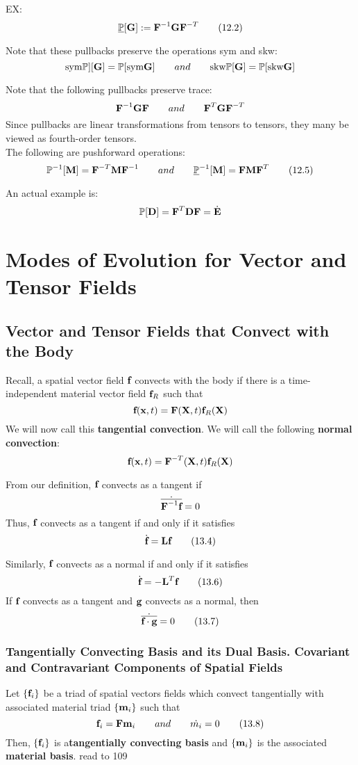 \documentclass{article}
\begin{document}
EX:
\[
\underline{\mathbb{P}}[\textbf{G}]:=\textbf{F}^{-1}\textbf{G}\textbf{F}^{-T}\tag{12.2}
\]

Note that these pullbacks preserve the operations sym and skw:
\[
	\text{sym}\mathbb{P}][\textbf{G}] = \mathbb{P}[\text{sym}\textbf{G}] \qquad and \qquad \text{skw}\mathbb{P}[\textbf{G}]=\mathbb{P}[\text{skw}\textbf{G}]
\]

Note that the following pullbacks preserve trace:
\[
	\textbf{F}^{-1}\textbf{G}\textbf{F} \qquad and \qquad \textbf{F}^T\textbf{G}\textbf{F}^{-T}
\]
Since pullbacks are linear transformations from tensors to tensors, they many be viewed as fourth-order tensors.\\
The following are pushforward operations:
\[
	\mathbb{P}^{-1}[\textbf{M}] = \textbf{F}^{-T}\textbf{M}\textbf{F}^{-1} \qquad and \qquad \underline{\mathbb{P}}^{-1}[\textbf{M}] = \textbf{F}\textbf{M}\textbf{F}^T \tag{12.5}
\]

An actual example is:
\[
	\mathbb{P}[\textbf{D}] = \textbf{F}^T\textbf{D}\textbf{F} = \dot{\textbf{E}}
\]

\section{Modes of Evolution for Vector and Tensor Fields}
\subsection{Vector and Tensor Fields that Convect with the Body}
Recall, a spatial vector field $\textbf{f}$ convects with the body if there is a time-independent material vector field $\textbf{f}_R$ such that
\[
	\textbf{f}(\textbf{x},t) = \textbf{F}(\textbf{X},t)\textbf{f}_R(\textbf{X})
\]
We will now call this \textbf{tangential convection}.
We will call the following \textbf{normal convection}:
\[
	\textbf{f}(\textbf{x},t) = \textbf{F}^{-T}(\textbf{X},t)\textbf{f}_R(\textbf{X})
\]

From our definition, $\textbf{f}$ convects as a tangent if
\[
	\dot{\overline{\textbf{F}^{-1}\textbf{f}}} = 0
\]
Thus, $\textbf{f}$ convects as a tangent if and only if it satisfies
\[
	\dot{\textbf{f}}=\textbf{L}\textbf{f}\tag{13.4}
\]

Similarly, $\textbf{f}$ convects as a normal if and only if it satisfies
\[
	\dot{\textbf{f}} = -\textbf{L}^T\textbf{f}\tag{13.6}
\]
If $\textbf{f}$ convects as a tangent and $\textbf{g}$ convects as a normal, then 
\[
	\dot{\overline{\textbf{f}\cdot\textbf{g}}} = 0\tag{13.7}
\]
\subsubsection{Tangentially Convecting Basis and its Dual Basis. Covariant and Contravariant Components of Spatial Fields}
Let $\lbrace \textbf{f}_i\rbrace$ be a triad of spatial vectors fields which convect tangentially with associated material triad $\lbrace \textbf{m}_i\rbrace$ such that 
\[
	\textbf{f}_i = \textbf{F}\textbf{m}_i \qquad and \qquad \dot{m_i} = 0\tag{13.8}
\]
Then, $\lbrace\textbf{f}_i\rbrace$ is a\textbf{tangentially convecting basis} and $\lbrace\textbf{m}_i\rbrace$ is the associated \textbf{material basis}.
read to 109
\end{document}
